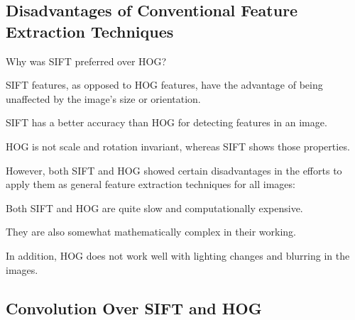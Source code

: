 	\subsection{Disadvantages of Conventional Feature Extraction Techniques}
	\begin{bulletedlist}
		\item Why was SIFT preferred over HOG?
		\begin{bulletedlist}
			\item SIFT features, as opposed to HOG features, have the advantage of being unaffected by the image's size or orientation.
			\item SIFT has a better accuracy than HOG for detecting features in an image.
			\item HOG is not scale and rotation invariant, whereas SIFT shows those properties.
		\end{bulletedlist}
		\item However, both SIFT and HOG showed certain disadvantages in the efforts to apply them as general feature extraction techniques for all images:
		\begin{bulletedlist}
			\item Both SIFT and HOG are quite slow and computationally expensive.
			\item They are also somewhat mathematically complex in their working.
			\item In addition, HOG does not work well with lighting changes and blurring in the images.
		\end{bulletedlist}
	\end{bulletedlist}

	\subsection{Convolution Over SIFT and HOG}

